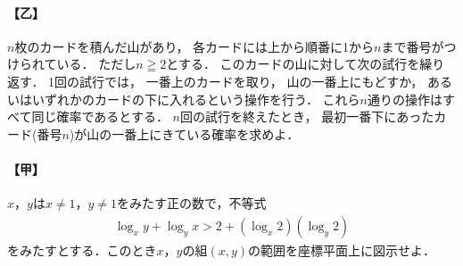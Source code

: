 \documentclass[../../main.tex]{subfiles}
\begin{document}
\paragraph{【乙】}
$n$枚のカードを積んだ山があり，
各カードには上から順番に1から$n$まで番号がつけられている．
ただし$n\geqq2$とする．
このカードの山に対して次の試行を繰り返す．
1回の試行では，
一番上のカードを取り，
山の一番上にもどすか，
あるいはいずれかのカードの下に入れるという操作を行う．
これら$n$通りの操作はすべて同じ確率であるとする．
$n$回の試行を終えたとき，
最初一番下にあったカード(番号$n$)が山の一番上にきている確率を求めよ．

\paragraph{【甲】}
$x$，$y$は$x \neq 1$，$y \neq 1$をみたす正の数で，不等式
\begin{align}
  \log_x y + \log_y x > 2 + (\log_x 2)(\log_y 2)
\end{align}
をみたすとする．このとき$x$，$y$の組$(x,y)$の範囲を座標平面上に図示せよ．
\end{document}
